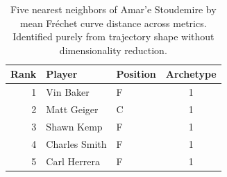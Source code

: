 \begin{table}[htbp]
  \centering\small
  \begin{tabular}{rllc}
    \toprule
    Rank & Player & Position & Archetype \\
    \midrule
    1 & Vin Baker & F & 1 \\
    2 & Matt Geiger & C & 1 \\
    3 & Shawn Kemp & F & 1 \\
    4 & Charles Smith & F & 1 \\
    5 & Carl Herrera & F & 1 \\
    \bottomrule
  \end{tabular}
  \caption{Five nearest neighbors of Amar'e Stoudemire by mean Fr\'{e}chet curve distance across metrics. Identified purely from trajectory shape without dimensionality reduction.}
  \label{tab:Amar_e_Stoudemire_frechet_curve_neighbors}
\end{table}

